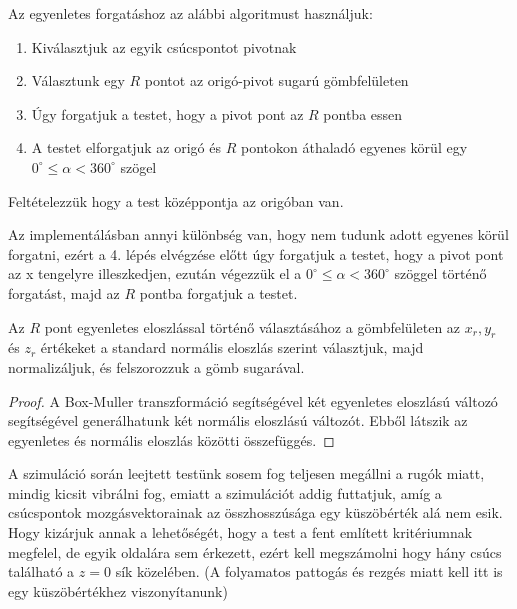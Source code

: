 \noindent Az egyenletes forgatáshoz az alábbi algoritmust használjuk:
\begin{enumerate}
	\item Kiválasztjuk az egyik csúcspontot pivotnak
	\item Választunk egy $R$ pontot az origó-pivot sugarú gömbfelületen
	\item Úgy forgatjuk a testet, hogy a pivot pont az $R$ pontba essen
	\item A testet elforgatjuk az origó és $R$  pontokon áthaladó egyenes körül egy $0^\circ \leq \alpha < 360^\circ$ szögel
\end{enumerate}
\begin{remark}
Feltételezzük hogy a test középpontja az origóban van.
\end{remark}
Az implementálásban annyi különbség van, hogy nem tudunk adott egyenes körül forgatni, ezért a 4. lépés elvégzése előtt úgy forgatjuk a testet, hogy a pivot pont az x tengelyre illeszkedjen, ezután végezzük el a $0^\circ \leq \alpha < 360^\circ$ szöggel történő forgatást, majd az $R$ pontba forgatjuk a testet.

Az $R$ pont egyenletes eloszlással történő választásához a gömbfelületen az $x_r, y_r$ és $z_r$ értékeket a standard normális eloszlás szerint választjuk, majd normalizáljuk, és felszorozzuk a gömb sugarával.
\begin{proof}
A Box-Muller transzformáció segítségével két egyenletes eloszlású változó segítségével generálhatunk két normális eloszlású változót. Ebből látszik az egyenletes és normális eloszlás közötti összefüggés.
\end{proof}


A szimuláció során leejtett testünk sosem fog teljesen megállni a rugók miatt, mindig kicsit vibrálni fog, emiatt a szimulációt addig futtatjuk, amíg a csúcspontok mozgásvektorainak az összhosszúsága egy küszöbérték alá nem esik.
Hogy kizárjuk annak a lehetőségét, hogy a test a fent említett kritériumnak megfelel, de egyik oldalára sem érkezett, ezért kell megszámolni hogy hány csúcs található a $z=0$ sík közelében. (A folyamatos pattogás és rezgés miatt kell itt is egy küszöbértékhez viszonyítanunk)

